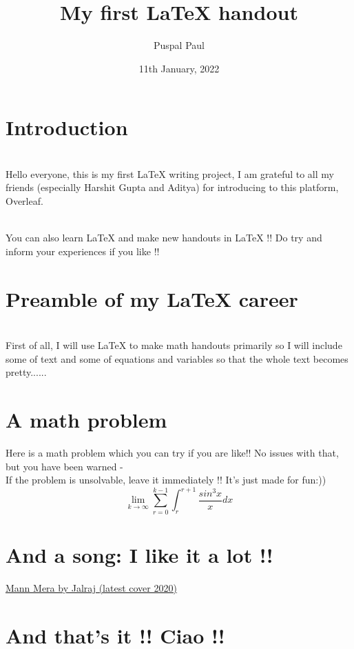 \documentclass{article}
\title{My first LaTeX handout}
\author{Puspal Paul}
\date{11th January, 2022}
\begin{document}
\maketitle

\section{Introduction}
\\Hello everyone, this is my first LaTeX writing project, I am grateful to all my friends (especially Harshit Gupta and Aditya) for introducing to this platform, Overleaf. 

\\You can also learn LaTeX and make new handouts in LaTeX !! Do try and inform your experiences if you like !!
\maketitle

\section{Preamble of my LaTeX career}
\\First of all, I will use LaTeX to make math handouts primarily so I will include some of  text and some of equations and variables so that the whole text becomes pretty......

\maketitle

\section{A math problem}
Here is a math problem which you can try if you are like!! No issues with that, but you have been warned - 
\\If the problem is unsolvable, leave it immediately !! It's just made for fun:))  
\begin{displaymath}
    \lim_{k\rightarrow \infty} \sum_{r=0}^{k-1} \int_{r}^{r+1} \frac{sin^{3}x}{x}dx
\end{displaymath}

\maketitle
\section{And a song: I like it a lot !!} 

\href{https://www.youtube.com/watch?v=GMGD-C6j0U8}{Mann Mera by Jalraj (latest cover 2020)}

\maketitle
\section{And that's it !! Ciao !!}
\end{document}
